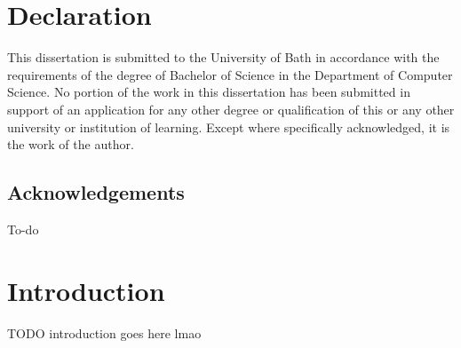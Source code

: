 \documentclass[11pt,a4paper]{article}
\begin{document}
\section*{Declaration}
This dissertation is submitted to the University of Bath in accordance with the requirements of the degree of Bachelor of Science in the Department of Computer Science. No portion of the work in this dissertation has been submitted in support of an application for any other degree or qualification of this or any other university or institution of learning. Except where specifically acknowledged, it is the work of the author.

\newpage

\tableofcontents
\listoffigures
\listoftables

\newpage

\begin{center}
   \section*{Acknowledgements}
   To-do



    


    


\end{center}

\newpage


\section{Introduction}
TODO introduction goes here lmao
\end{document}
